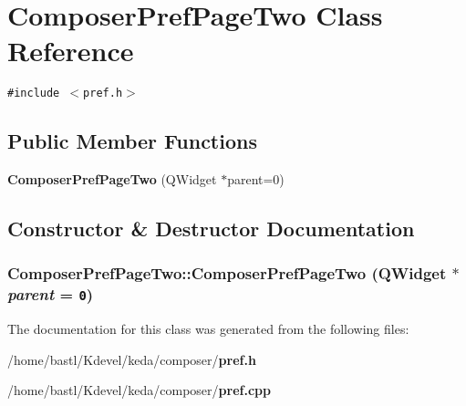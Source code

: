 \section{Composer\-Pref\-Page\-Two Class Reference}
\label{classComposerPrefPageTwo}
{\tt \#include $<$pref.h$>$}

\subsection*{Public Member Functions}
\begin{CompactItemize}
\item 
{\bf Composer\-Pref\-Page\-Two} (QWidget $\ast$parent=0)
\end{CompactItemize}


\subsection{Constructor \& Destructor Documentation}
\subsubsection{\setlength{\rightskip}{0pt plus 5cm}Composer\-Pref\-Page\-Two::Composer\-Pref\-Page\-Two (QWidget $\ast$ {\em parent} = {\tt 0})}\label{classComposerPrefPageTwo_f9b5ffe601f3d9be58589bd826cda54a}




The documentation for this class was generated from the following files:\begin{CompactItemize}
\item 
/home/bastl/Kdevel/keda/composer/{\bf pref.h}\item 
/home/bastl/Kdevel/keda/composer/{\bf pref.cpp}\end{CompactItemize}
